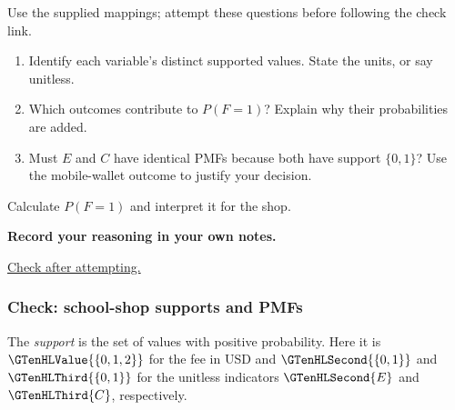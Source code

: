 \noindent{} Use the supplied mappings; attempt these questions before following the check link.
\begin{enumerate}
\item Identify each variable's distinct supported values. State the units, or say unitless.
\item Which outcomes contribute to $P(F=1)$? Explain why their probabilities are added.
\item Must $E$ and $C$ have identical PMFs because both have support $\{0,1\}$? Use the mobile-wallet outcome to justify your decision.
\end{enumerate}
\noindent{} Calculate $P(F=1)$ and interpret it for the shop.
\par\medskip\noindent\textbf{Record your reasoning in your own notes.}\par

\par\smallskip\noindent\hyperref[check:school-shop]{Check after attempting.}
\subsubsection*{Check: school-shop supports and PMFs}\label{check:school-shop}

The \emph{support} is the set of values with positive probability. Here it is $\GTenHLValue{\{0,1,2\}}$ for the fee in USD and $\GTenHLSecond{\{0,1\}}$ and $\GTenHLThird{\{0,1\}}$ for the unitless indicators $\GTenHLSecond{E}$ and $\GTenHLThird{C}$, respectively.

